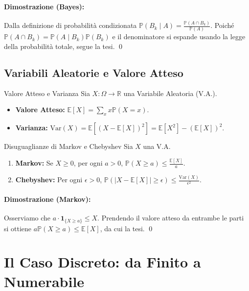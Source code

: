 \documentclass[11pt,a4paper]{article}
\begin{document}
\paragraph{Dimostrazione (Bayes):} Dalla definizione di probabilità condizionata $\mathbb{P}(B_k \mid A) = \frac{\mathbb{P}(A \cap B_k)}{\mathbb{P}(A)}$. Poiché $\mathbb{P}(A \cap B_k) = \mathbb{P}(A \mid B_k)\mathbb{P}(B_k)$ e il denominatore si espande usando la legge della probabilità totale, segue la tesi. \qed

\subsection{Variabili Aleatorie e Valore Atteso}

\begin{definizione}{Valore Atteso e Varianza}{}
Sia $X: \Omega \to \mathbb{R}$ una Variabile Aleatoria (V.A.).
\begin{itemize}
    \item \textbf{Valore Atteso:} $\mathbb{E}[X] = \sum_{x} x \mathbb{P}(X=x)$.
    \item \textbf{Varianza:} $\text{Var}(X) = \mathbb{E}[(X - \mathbb{E}[X])^2] = \mathbb{E}[X^2] - (\mathbb{E}[X])^2$.
\end{itemize}
\end{definizione}

\begin{teorema}{Disuguaglianze di Markov e Chebyshev}{}
Sia $X$ una V.A.
\begin{enumerate}
    \item \textbf{Markov:} Se $X \ge 0$, per ogni $a > 0$, $\mathbb{P}(X \ge a) \le \frac{\mathbb{E}[X]}{a}$.
    \item \textbf{Chebyshev:} Per ogni $\epsilon > 0$, $\mathbb{P}(|X - \mathbb{E}[X]| \ge \epsilon) \le \frac{\text{Var}(X)}{\epsilon^2}$.
\end{enumerate}
\end{teorema}
\paragraph{Dimostrazione (Markov):} Osserviamo che $a \cdot \mathbf{1}_{\{X \ge a\}} \le X$. Prendendo il valore atteso da entrambe le parti si ottiene $a \mathbb{P}(X \ge a) \le \mathbb{E}[X]$, da cui la tesi. \qed

\newpage
\section{Il Caso Discreto: da Finito a Numerabile}
\end{document}
